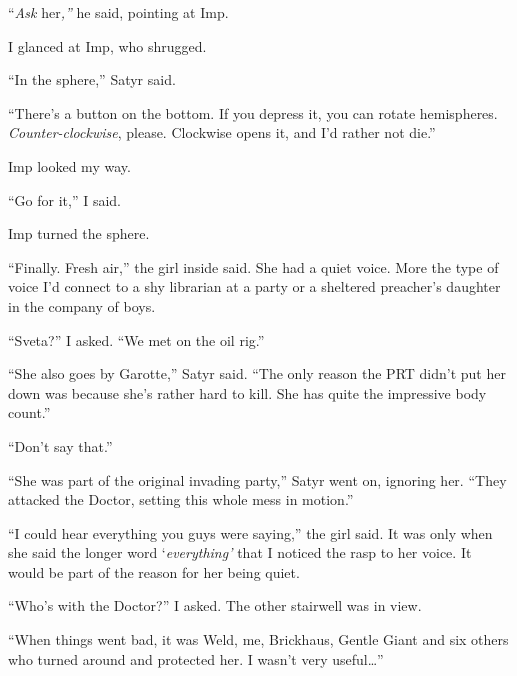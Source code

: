 ``\emph{Ask }her\emph{,'' }he said, pointing at Imp.



I glanced at Imp, who shrugged.



``In the sphere,'' Satyr said.



``There's a button on the bottom.  If you depress it, you can rotate hemispheres.  \emph{Counter-clockwise}, please.  Clockwise opens it, and I'd rather not die.''



Imp looked my way.



``Go for it,'' I said.



Imp turned the sphere.



``Finally.  Fresh air,'' the girl inside said.  She had a quiet voice.  More the type of voice I'd connect to a shy librarian at a party or a sheltered preacher's daughter in the company of boys.



``Sveta?'' I asked.  ``We met on the oil rig.''



``She also goes by Garotte,'' Satyr said.  ``The only reason the PRT didn't put her down was because she's rather hard to kill.  She has quite the impressive body count.''



``Don't say that.''



``She was part of the original invading party,'' Satyr went on, ignoring her.  ``They attacked the Doctor, setting this whole mess in motion.''



``I could hear everything you guys were saying,'' the girl said.  It was only when she said the longer word `\emph{everything'} that I noticed the rasp to her voice.  It would be part of the reason for her being quiet.



``Who's with the Doctor?'' I asked.  The other stairwell was in view.



``When things went bad, it was Weld, me, Brickhaus, Gentle Giant and six others who turned around and protected her.  I wasn't very useful\ldots''



